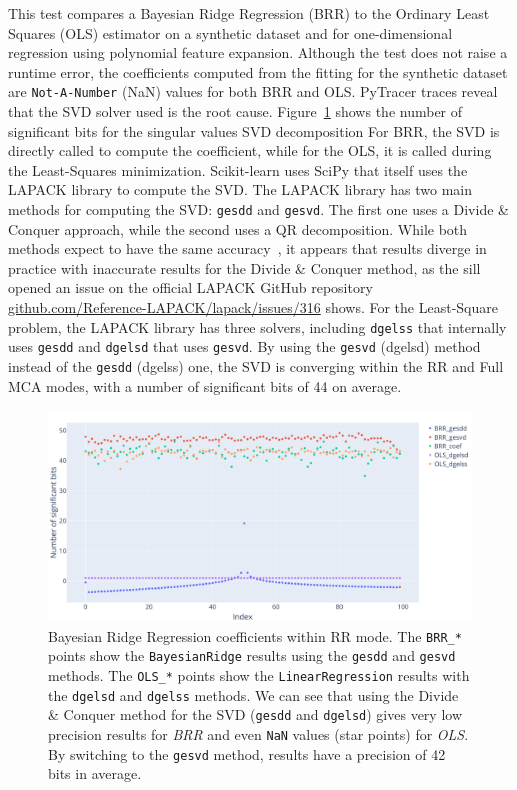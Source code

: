\documentclass[11pt]{article}
\newcommand{\pytracer}[0]{PyTracer\xspace}
\begin{document}
This test compares a Bayesian Ridge Regression (BRR) to the Ordinary Least Squares (OLS) estimator on a synthetic dataset and for one-dimensional regression using polynomial feature expansion. Although the test does not raise a runtime error, the coefficients computed from the fitting for the synthetic dataset are \texttt{Not-A-Number} (NaN) values for both BRR and OLS. \pytracer traces reveal that the SVD solver used is the root cause. Figure~\ref{fig:brr_svd_sig} shows
the number of significant bits for the singular values SVD decomposition 
For BRR, the SVD is directly called to compute the coefficient, while for the OLS, it is called during the Least-Squares minimization. Scikit-learn uses SciPy that itself uses the LAPACK library to compute the SVD.
The LAPACK library has two main methods for computing the SVD: 
\texttt{gesdd} and \texttt{gesvd}. The first one uses a Divide \& Conquer approach, while the second uses a QR decomposition. While both methods expect to have the same accuracy~\cite{nakatsukasa2013stable}, it appears that results diverge in practice with inaccurate results for the Divide \& Conquer method, as the sill opened an issue on the official LAPACK GitHub repository \href{https://github.com/Reference-LAPACK/lapack/issues/316}{github.com/Reference-LAPACK/lapack/issues/316} shows. For the Least-Square problem, the LAPACK library has three solvers, including \texttt{dgelss} that internally uses \texttt{gesdd} and \texttt{dgelsd} that uses \texttt{gesvd}. By using the \texttt{gesvd} (dgelsd) method instead of the \texttt{gesdd} (dgelss) one, the SVD is converging within the RR and Full MCA modes, with a number of significant bits of 44 on average.

\begin{figure}
    \centering
    \includegraphics[width=\linewidth]{figure/BRR/BRR_coefs_sig.pdf}
    \caption{Bayesian Ridge Regression coefficients within RR mode.
    The \texttt{BRR\_*} points show the \texttt{BayesianRidge} results
    using the \texttt{gesdd} and \texttt{gesvd} methods. 
    The \texttt{OLS\_*} points show the \texttt{LinearRegression} results
    with the \texttt{dgelsd} and \texttt{dgelss} methods.
    We can see that using the Divide \& Conquer method for the SVD
    (\texttt{gesdd} and  \texttt{dgelsd})
    gives very low precision
    results for \textit{BRR} and even \texttt{NaN} values (star points) for \textit{OLS}. By switching to the \texttt{gesvd} method, 
    results have a precision of 42 bits in average.
    }
    \label{fig:brr_svd_sig}
\end{figure}
\end{document}
